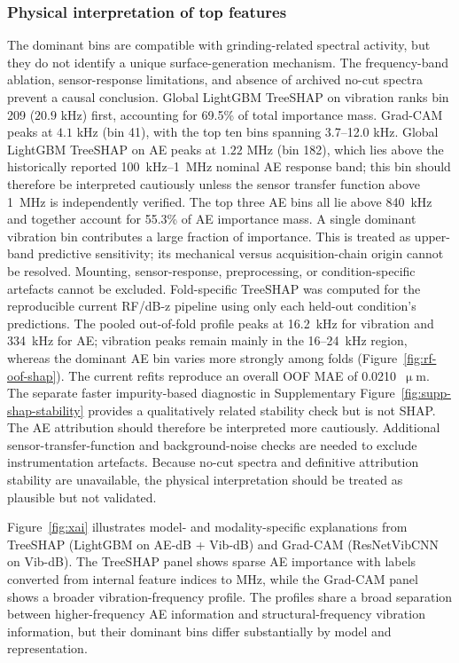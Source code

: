 \subsubsection{Physical interpretation of top features}\label{sec:top-features}

The dominant bins are compatible with grinding-related spectral activity,
but they do not identify a unique surface-generation mechanism. The
frequency-band ablation, sensor-response limitations, and absence of
archived no-cut spectra prevent a causal conclusion. Global LightGBM
TreeSHAP on vibration ranks bin 209 (\(20.9\) kHz)
first, accounting for 69.5\% of total importance mass. Grad-CAM peaks at
\(4.1\) kHz (bin 41), with the top ten bins spanning 3.7--12.0 kHz.
Global LightGBM TreeSHAP on AE peaks at \(1.22\) MHz (bin 182), which lies above the
historically reported 100~kHz--1~MHz nominal AE response band; this bin
should therefore be interpreted cautiously unless the sensor transfer
function above 1~MHz is independently verified. The top three AE bins
all lie above 840~kHz and together account for 55.3\% of AE importance
mass. A single dominant vibration bin contributes a large fraction of
importance. This is treated as upper-band predictive sensitivity; its
mechanical versus acquisition-chain origin cannot be resolved. Mounting,
sensor-response, preprocessing, or condition-specific artefacts cannot be
excluded. Fold-specific TreeSHAP was computed for the
reproducible current RF/dB-z pipeline using only each held-out condition's
predictions. The pooled out-of-fold profile peaks at 16.2~kHz for vibration
and 334~kHz for AE; vibration peaks remain mainly in the 16--24~kHz region,
whereas the dominant AE bin varies more strongly among folds
(Figure~\ref{fig:rf-oof-shap}). The current refits reproduce
an overall OOF MAE of 0.0210~\(\upmu\)m. The separate faster impurity-based
diagnostic in Supplementary Figure~\ref{fig:supp-shap-stability} provides a
qualitatively related stability check but is not SHAP. The AE attribution
should therefore be interpreted more cautiously. Additional
sensor-transfer-function and background-noise checks are needed to
exclude instrumentation artefacts. Because no-cut spectra and definitive
attribution stability are unavailable, the physical interpretation should
be treated as plausible but not validated.

Figure~\ref{fig:xai} illustrates model- and modality-specific explanations
from TreeSHAP (LightGBM on AE-dB + Vib-dB) and Grad-CAM
(ResNetVibCNN on Vib-dB). The TreeSHAP panel shows sparse AE importance
with labels converted from internal feature indices to MHz, while the
Grad-CAM panel shows a broader vibration-frequency profile. The profiles
share a broad separation between higher-frequency AE information and
structural-frequency vibration information, but their dominant bins differ
substantially by model and representation.

